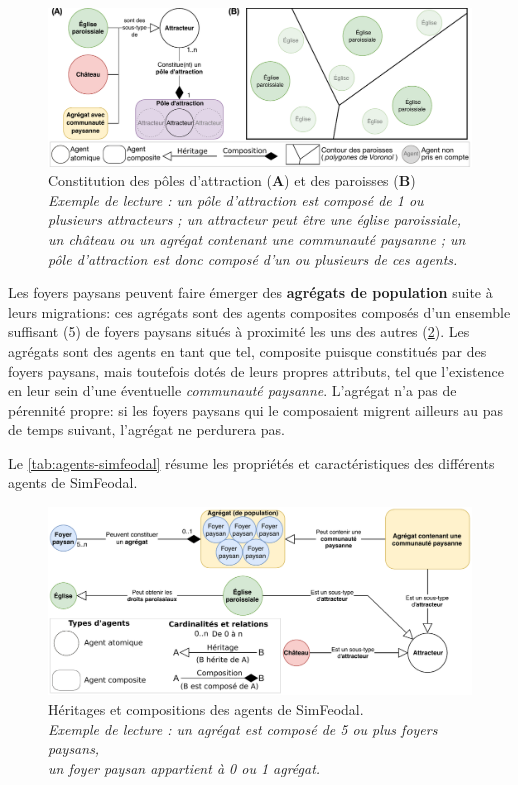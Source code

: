 \begin{figure}[H]
	\centering
	\includegraphics[width=\linewidth]{img/agents_paroisses_poles.pdf}
	\caption{Constitution des pôles d'attraction (\textbf{A}) et des paroisses (\textbf{B})\\
		\textit{Exemple de lecture : un pôle d'attraction est composé de 1 ou plusieurs attracteurs ;
			un attracteur peut être une église paroissiale, un château ou un agrégat contenant une communauté paysanne ;
			un pôle d'attraction est donc composé d'un ou plusieurs de ces agents.}}
	\label{fig:constitution-poles-paroisses}
\end{figure}\vspace{-.5em}
\noindent Les foyers paysans peuvent faire émerger des \textbf{agrégats de population} suite à leurs migrations: ces agrégats sont des agents composites composés d'un ensemble suffisant (5) de foyers paysans situés à proximité les uns des autres (\cref{fig:constitution-agents}).
Les agrégats sont des agents en tant que tel, composite puisque constitués par des foyers paysans, mais toutefois dotés de leurs propres attributs, tel que l'existence en leur sein d'une éventuelle \textit{communauté paysanne}.
L'agrégat n'a pas de pérennité propre: si les foyers paysans qui le composaient migrent ailleurs au pas de temps suivant, l'agrégat ne perdurera pas.

\noindent Le \cref{tab:agents-simfeodal} résume les propriétés et caractéristiques des différents agents de SimFeodal.

\begin{figure}[H]
	\centering
	\includegraphics[width=\linewidth]{img/agents_constitution.pdf}
	\caption{Héritages et compositions des agents de SimFeodal.\\
		\textit{Exemple de lecture : un agrégat est composé de 5 ou plus foyers paysans,\\
			un foyer paysan appartient à 0 ou 1 agrégat.}}
	\label{fig:constitution-agents}
\end{figure}

